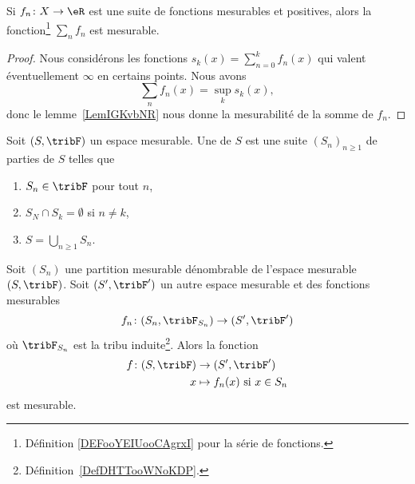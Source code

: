 \begin{proposition}\label{PropFYPEOIJ}
    Si \( f_n\colon X\to \eR\) est une suite de fonctions mesurables et positives, alors la fonction\footnote{Définition \ref{DEFooYEIUooCAgrxI} pour la série de fonctions.} \( \sum_nf_n\) est mesurable.
\end{proposition}

\begin{proof}
    Nous considérons les fonctions \( s_k(x)=\sum_{n=0}^kf_n(x)\) qui valent éventuellement \( \infty\) en certains points. Nous avons
    \begin{equation}
        \sum_nf_n(x)=\sup_ks_k(x),
    \end{equation}
    donc le lemme~\ref{LemIGKvbNR} nous donne la mesurabilité de la somme de \( f_n\).
\end{proof}

\begin{definition}      \label{ooUDHFooJjKscR}
    Soit \( (S,\tribF)\) un espace mesurable.
    Une  de \( S\) est une suite  \( (S_n)_{n\geq 1}\) de parties de \( S\) telles que
    \begin{enumerate}
        \item
            \( S_n\in\tribF\) pour tout \( n\),
        \item
            \( S_N\cap S_k=\emptyset\) si \( n\neq k\),
        \item
            \( S=\bigcup_{n\geq 1}S_n\).
    \end{enumerate}
\end{definition}

\begin{lemma}     \label{LEMooXAPQooPpZUmP}
    Soit \( (S_n)\) une partition mesurable dénombrable de l'espace mesurable \( (S,\tribF)\). Soit \( (S',\tribF')\) un autre espace mesurable et des fonctions mesurables
    \begin{equation}
        f_n\colon (S_n,\tribF_{S_n})\to (S',\tribF')
    \end{equation}
    où \( \tribF_{S_n}\) est la tribu induite\footnote{Définition~\ref{DefDHTTooWNoKDP}.}. Alors la fonction
    \begin{equation}
        \begin{aligned}
            f\colon (S,\tribF)  & \to (S',\tribF')                    \\
                      x         & \mapsto f_n(x) \text{ si } x\in S_n
        \end{aligned}
    \end{equation}
    est mesurable.
\end{lemma}

